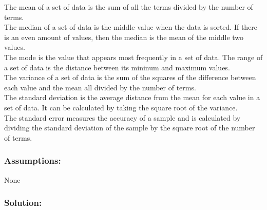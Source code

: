 \documentclass[
]{article}
\begin{document}
The mean of a set of data is the sum of all the terms divided by the number of terms.\\
The median of a set of data is the middle value when the data is sorted. If there is an even amount of values, then the median is the mean of the middle two values.\\
The mode is the value that appears most frequently in a set of data.
The range of a set of data is the distance between its mininum and maximum values.\\
The variance of a set of data is the sum of the squares of the difference between each value and the mean all divided by the number of terms.\\
The standard deviation is the average distance from the mean for each value in a set of data. It can be calculated by taking the square root of the variance.\\
The standard error measures the accuracy of a sample and is calculated by dividing the standard deviation of the sample by the square root of the number of terms.

\hypertarget{assumptions}{%
\subsubsection{Assumptions:}\label{assumptions}}

None

\hypertarget{solution}{%
\subsubsection{Solution:}\label{solution}}
\end{document}
